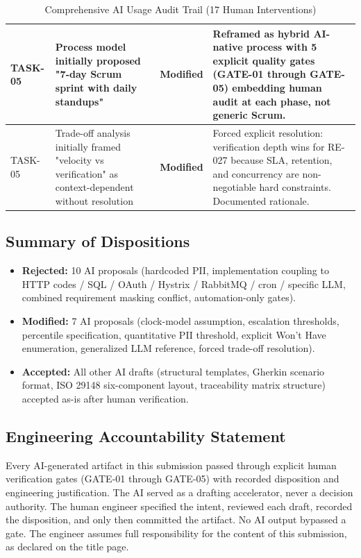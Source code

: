 \documentclass[10pt,a4paper]{article}
\begin{document}
\begin{table}[h]
\begin{tabularx}{\textwidth}{|l|X|l|X|}
\hline
TASK-05 & Process model initially proposed "7-day Scrum sprint with daily standups" & \textbf{Modified} & Reframed as hybrid AI-native process with 5 explicit quality gates (GATE-01 through GATE-05) embedding human audit at each phase, not generic Scrum. \\
\hline
TASK-05 & Trade-off analysis initially framed "velocity vs verification" as context-dependent without resolution & \textbf{Modified} & Forced explicit resolution: verification depth wins for RE-027 because SLA, retention, and concurrency are non-negotiable hard constraints. Documented rationale. \\
\hline
\end{tabularx}
\caption{Comprehensive AI Usage Audit Trail (17 Human Interventions)}
\end{table}

\subsection*{Summary of Dispositions}

\begin{itemize}[leftmargin=*]
 \item \textbf{Rejected:} 10 AI proposals (hardcoded PII, implementation coupling to HTTP codes / SQL / OAuth / Hystrix / RabbitMQ / cron / specific LLM, combined requirement masking conflict, automation-only gates).
 \item \textbf{Modified:} 7 AI proposals (clock-model assumption, escalation thresholds, percentile specification, quantitative PII threshold, explicit Won't Have enumeration, generalized LLM reference, forced trade-off resolution).
 \item \textbf{Accepted:} All other AI drafts (structural templates, Gherkin scenario format, ISO 29148 six-component layout, traceability matrix structure) accepted as-is after human verification.
\end{itemize}

\subsection*{Engineering Accountability Statement}

Every AI-generated artifact in this submission passed through explicit human verification gates (GATE-01 through GATE-05) with recorded disposition and engineering justification. The AI served as a drafting accelerator, never a decision authority. The human engineer specified the intent, reviewed each draft, recorded the disposition, and only then committed the artifact. No AI output bypassed a gate. The engineer assumes full responsibility for the content of this submission, as declared on the title page.
\end{document}
